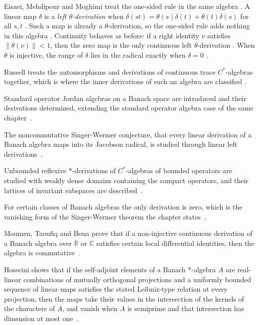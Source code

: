 Eisaei, Mehdipour and Moghimi treat the one-sided rule in the same algebra
\cite[p.~2]{EisaeiMehdipourMoghimi2024LeftTheta}. A linear map $\delta$ is a
\emph{left $\theta$-derivation} when
$\delta(st)=\theta(s)\delta(t)+\theta(t)\delta(s)$ for all $s,t$
\cite[p.~2]{EisaeiMehdipourMoghimi2024LeftTheta}. Such a map is already a
$\theta$-derivation, so the one-sided rule adds nothing in this algebra
\cite[Theorem~2.2, p.~4]{EisaeiMehdipourMoghimi2024LeftTheta}. Continuity
behaves as before: if a right identity $\nu$ satisfies $\|\theta(\nu)\|<1$,
then the zero map is the only continuous left $\theta$-derivation
\cite[Corollary~2.5, p.~6]{EisaeiMehdipourMoghimi2024LeftTheta}. When $\theta$ is injective, the range of
$\delta$ lies in the radical exactly when $\delta=0$
\cite[Theorem~2.7, p.~7]{EisaeiMehdipourMoghimi2024LeftTheta}.

Russell treats the automorphisms and derivations of continuous trace
$C^{*}$-algebras together, which is where the inner derivations of such an
algebra are classified \cite[Abstract, p.~1]{Russell1980ContinuousTrace}.

Standard operator Jordan algebras on a Banach space are introduced and their derivations determined, extending the standard operator algebra case of the same chapter~\cite{WlStandardOperatorJordan2022}.

The noncommutative Singer-Wermer conjecture, that every linear derivation of a Banach algebra maps into its Jacobson radical, is studied through linear left derivations~\cite{WlNoncommutativeVersionsOf2008}.

Unbounded reflexive $*$-derivations of $C^*$-algebras of bounded operators are studied with weakly dense domains containing the compact operators, and their lattices of invariant subspaces are described~\cite{WlReflexiveStarDerivationsAndLat2017}.

For certain classes of Banach algebras the only derivation is zero, which is the vanishing form of the Singer-Wermer theorem the chapter states~\cite{WlNonexistenceOfNonzeroDerivatio2014}.

Moumen, Taoufiq and Boua prove that if a non-injective continuous derivation of a Banach algebra over $\mathbb{R}$ or $\mathbb{C}$ satisfies certain local differential identities, then the algebra is commutative~\cite{WlOnPrimeBanachAlgebrasWithConti2023}.

Hosseini shows that if the self-adjoint elements of a Banach $*$-algebra $A$ are real-linear combinations of mutually orthogonal projections and a uniformly bounded sequence of linear maps satisfies the stated Leibniz-type relation at every projection, then the maps take their values in the intersection of the kernels of the characters of $A$, and vanish when $A$ is semiprime and that intersection has dimension at most one~\cite{WlSomeConditionsUnderWhichDeriva2017}.

